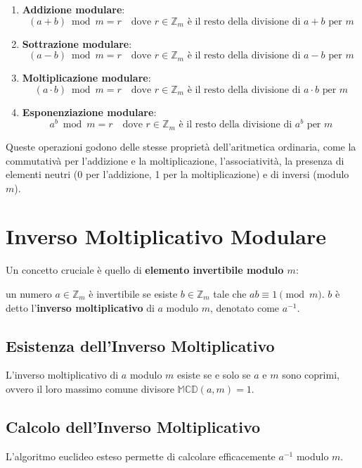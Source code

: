 \documentclass[a4paper,12pt]{report}
\begin{document}
\begin{enumerate}
   \item \textbf{Addizione modulare}:
   $$(a + b) \bmod m = r \quad \text{dove } r \in \mathbb{Z}_m \text{ è il resto della divisione di } a+b \text{ per } m$$
   
   \item \textbf{Sottrazione modulare}:
   $$(a - b) \bmod m = r \quad \text{dove } r \in \mathbb{Z}_m \text{ è il resto della divisione di } a-b \text{ per } m$$
   
   \item \textbf{Moltiplicazione modulare}:
   $$(a \cdot b) \bmod m = r \quad \text{dove } r \in \mathbb{Z}_m \text{ è il resto della divisione di } a \cdot b \text{ per } m$$
   
   \item \textbf{Esponenziazione modulare}:
   $$a^b \bmod m = r \quad \text{dove } r \in \mathbb{Z}_m \text{ è il resto della divisione di } a^b \text{ per } m$$
\end{enumerate}

Queste operazioni godono delle stesse proprietà dell'aritmetica ordinaria, come la commutativà per l'addizione e la moltiplicazione, l'associatività, la presenza di elementi neutri (0 per l'addizione, 1 per la moltiplicazione) e di inversi (modulo $m$).

\section{Inverso Moltiplicativo Modulare}

Un concetto cruciale è quello di \textbf{elemento invertibile modulo $m$}: 

un numero $a \in \mathbb{Z}_m$ è invertibile se esiste $b \in \mathbb{Z}_m$ tale che $ab \equiv 1 \pmod{m}$. $b$ è detto l'\textbf{inverso moltiplicativo} di $a$ modulo $m$, denotato come $a^{-1}$.

\subsection*{Esistenza dell'Inverso Moltiplicativo}
L'inverso moltiplicativo di $a$ modulo $m$ esiste se e solo se $a$ e $m$ sono coprimi, ovvero il loro massimo comune divisore $\mathbb{MCD}(a,m) = 1$. 

\subsection*{Calcolo dell'Inverso Moltiplicativo}
L'algoritmo euclideo esteso permette di calcolare efficacemente $a^{-1}$ modulo $m$.
\end{document}

